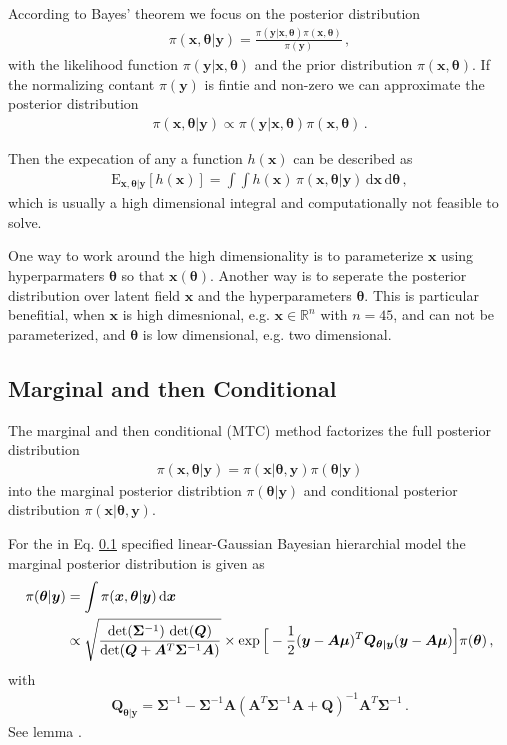 According to Bayes' theorem we focus on the posterior distribution
\begin{align}
	\pi(\bm{x},\bm{\theta}|\bm{y}) = \frac{ \pi(\bm{y} | \bm{x}, \bm{\theta} ) \pi(\bm{x}, \bm{\theta})}{\pi(\bm{y})} \, ,
\end{align}
with the likelihood function $\pi(\bm{y} | \bm{x}, \bm{\theta} )$ and the prior distribution $\pi(\bm{x}, \bm{\theta})$.
If the normalizing contant $\pi(\bm{y})$ is fintie and non-zero we can approximate the posterior distribution
\begin{align}
	\pi(\bm{x},\bm{\theta}|\bm{y}) \propto \pi(\bm{y} | \bm{x}, \bm{\theta} ) \pi(\bm{x}, \bm{\theta}) \, .
\end{align}

Then the expecation of any a function $h(\bm{x})$ can be described as 
\begin{align}
	\text{E}_{\bm{x},\bm{\theta}|\bm{y}} [h(\bm{x})] =  \int \int   h(\bm{x}) \,  \pi(\bm{x}, \bm{\theta} | \bm{y} ) \, \text{d} \bm{x}  \, \text{d} \bm{\theta}   \label{eq:expPos} \, ,
\end{align}
which is usually a high dimensional integral and computationally not feasible to solve.

One way to work around the high dimensionality is to parameterize $\bm{x}$ using hyperparmaters $\bm{\theta}$ so that $\bm{x}(\bm{\theta})$. 
Another way is to seperate the posterior distribution over latent field $\bm{x}$ and the hyperparameters $\bm{\theta}$.
This is particular benefitial, when $\bm{x}$ is high dimesnional, e.g. $\bm{x} \in \mathbb{R}^n$ with $n = 45$, and can not be parameterized, and $\bm{\theta}$ is low dimensional, e.g. two dimensional.


\subsection{Marginal and then Conditional}
The marginal and then conditional (MTC) method factorizes the full posterior distribution 
\begin{align}
	\pi(\bm{x}, \bm{\theta}|\bm{y}) = \pi(\bm{x}| \bm{\theta}, \bm{y}) \pi(\bm{\theta}|\bm{y})
\end{align}
into the marginal posterior distribtion $ \pi(\bm{\theta}|\bm{y})$ and conditional posterior distribution $\pi(\bm{x}| \bm{\theta}, \bm{y})$.


For the in Eq. \ref{} specified linear-Gaussian Bayesian hierarchial model the marginal posterior distribution is given as
\begin{align}
	\pi(\bm{\theta} | \bm{y}) &= \int \pi(\bm{x}, \bm{\theta} | \bm{y}) \mathop{}\!\mathrm{d} \bm{x} \\ 
	\label{eq:condHyper}
	&\propto \sqrt{ \frac{ \det( \bm{\Sigma}^{-1} ) \,  \det( \bm{Q}) }{\det( \bm{Q} + \bm{A}^T \bm{\Sigma}^{-1} \bm{A} ) } } \times \exp \Big[ - \frac{1}{2}(\bm{y} -\bm{A \mu})^T \bm{Q}_{\bm{\theta|y}} (\bm{y} -\bm{A \mu}) \Big] \pi(\bm{\theta}) \, ,
\end{align}
with
\begin{align}
	\bm{Q}_{\bm{\theta|y}} = \bm{\Sigma}^{-1} - \bm{\Sigma}^{-1} \bm{A} (\bm{A}^T \bm{\Sigma}^{-1} \bm{A} + \bm{Q} )^{-1} \bm{A}^T \bm{\Sigma}^{-1} \,  .
\end{align}
See lemma \cite{}.

